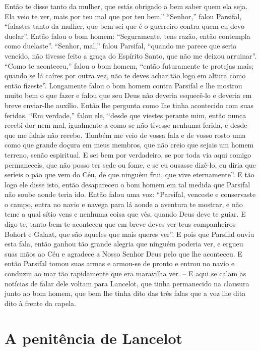 Então te disse tanto da mulher, que estás obrigado a bem saber quem ela
seja. Ela veio te ver, mais por teu mal que por teu bem.” “Senhor,” falou
Parsifal, “falastes tanto da mulher, que bem sei que é o guerreiro contra quem
eu devo duelar”. Então falou o bom homem: “Seguramente, tens razão, então
contempla como duelaste”. “Senhor, mal,” falou Parsifal, “quando me parece que
seria vencido, não tivesse feito a graça do Espírito Santo, que não me deixou
arruinar”. “Como te aconteceu,” falou o bom homem, “então futuramente te
protejas mais; quando se lá caíres por outra vez, não te deves achar tão logo
em altura como então fizeste”. Longamente falou o bom homem contra Parsifal e
lhe mostrou muito bem o que fazer e falou que seu Deus não deveria esquecê-lo e
deveria em breve enviar-lhe auxílio. Então lhe pergunta como lhe tinha
acontecido com suas feridas. “Em verdade,” falou ele, “desde que viestes
perante mim, então nunca recebi dor nem mal, igualmente a como se não tivesse
nenhuma ferida, e desde que me falais não recebo. Também me veio de vossa fala
e de vosso rosto uma como que grande doçura em meus membros, que não creio que
sejais um homem terreno, senão espiritual. E sei bem por verdadeiro, se por
toda via aqui comigo permaneceis, que não posso ter sede ou fome, e se eu
ousasse dizê-lo, eu diria que seríeis o pão que vem do Céu, de que ninguém
frui, que vive eternamente”. E tão logo ele disse isto, então desapareceu o bom
homem em tal medida que Parsifal não soube aonde teria ido. Então falou uma
voz: “Parsifal, venceste e conservaste o campo, entra no navio e navega para
lá aonde a aventura te mostrar, e não teme a qual sítio vens e nenhuma coisa
que vês, quando Deus deve te guiar. E digo-te, tanto bem te aconteceu que em
breve deves ver teus companheiros Bohort e Galaat, que são aqueles que mais
queres ver”. E pois que Parsifal ouviu esta fala, então
ganhou tão grande alegria que ninguém poderia ver, e ergueu suas mãos ao Céu e
agradece a Nosso Senhor Deus pelo que lhe aconteceu. E então Parsifal tomou
suas armas e armou-se de pronto e entrou no navio e conduziu ao mar tão
rapidamente que era maravilha ver. – E aqui se calam as notícias de falar dele
voltam para Lancelot, que tinha permanecido na clausura junto ao bom homem,
que bem lhe tinha dito das três falas que a voz lhe dita dito à frente da
capela. 

\chapter{A penitência de Lancelot}

